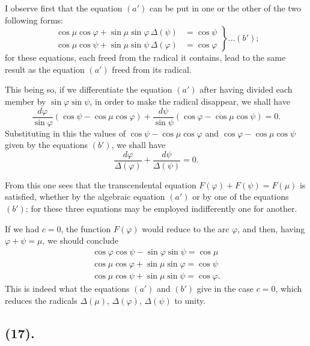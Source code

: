 \documentclass{article}
\begin{document}
I observe first that the equation $(a')$ can be put in one or the other of the two following forms:
\[ \left.\begin{aligned} \cos\mu\cos\varphi+\sin\mu\sin\varphi\,\Delta(\psi)&=\cos\psi\\ \cos\mu\cos\psi+\sin\mu\sin\psi\,\Delta(\varphi)&=\cos\varphi \end{aligned}\right\}\ldots(b'); \]
for these equations, each freed from the radical it contains, lead to the same result as the equation $(a')$ freed from its radical.

This being so, if we differentiate the equation $(a')$ after having divided each member by $\sin\varphi\sin\psi$, in order to make the radical disappear, we shall have
\[ \frac{d\varphi}{\sin\varphi}(\cos\psi-\cos\mu\cos\varphi)+\frac{d\psi}{\sin\psi}(\cos\varphi-\cos\mu\cos\psi)=0. \]
Substituting in this the values of $\cos\psi-\cos\mu\cos\varphi$ and $\cos\varphi-\cos\mu\cos\psi$ given by the equations $(b')$, we shall have
\[ \frac{d\varphi}{\Delta(\varphi)}+\frac{d\psi}{\Delta(\psi)}=0. \]

From this one sees that the transcendental equation $F(\varphi)+F(\psi)=F(\mu)$ is satisfied, whether by the algebraic equation $(a')$ or by one of the equations $(b')$; for these three equations may be employed indifferently one for another.

If we had $c=0$, the function $F(\varphi)$ would reduce to the arc $\varphi$, and then, having $\varphi+\psi=\mu$, we should conclude
\[ \begin{gathered} \cos\varphi\cos\psi-\sin\varphi\sin\psi=\cos\mu\\ \cos\mu\cos\varphi+\sin\mu\sin\varphi=\cos\psi\\ \cos\mu\cos\psi+\sin\mu\sin\psi=\cos\varphi. \end{gathered} \]
This is indeed what the equations $(a')$ and $(b')$ give in the case $c=0$, which reduces the radicals $\Delta(\mu)$, $\Delta(\varphi)$, $\Delta(\psi)$ to unity.

\subsection*{(17).}

\end{document}
